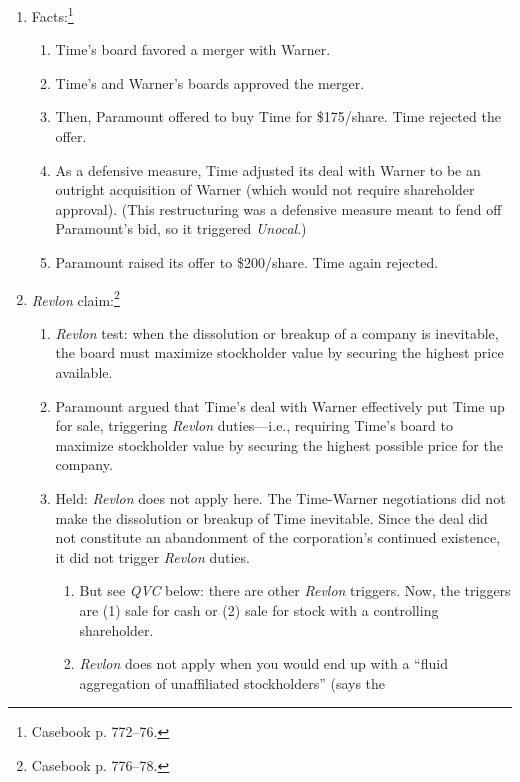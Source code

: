 \begin{enumerate}
    \item Facts:\footnote{Casebook p. 772--76.}
    \begin{enumerate}
        \item Time's board favored a merger with Warner.
        \item Time's and Warner's boards approved the merger.
        \item Then, Paramount offered to buy Time for \$175/share. Time rejected 
        the offer.
        \item As a defensive measure, Time adjusted its deal with Warner to be 
        an outright acquisition of Warner (which would not require shareholder 
        approval). (This restructuring was a defensive measure meant to fend off 
        Paramount's bid, so it triggered \emph{Unocal}.)
        \item Paramount raised its offer to \$200/share. Time again rejected.
    \end{enumerate}
    \item \emph{Revlon} claim:\footnote{Casebook p. 776--78.}
    \begin{enumerate}
        \item \emph{Revlon} test: when the dissolution or breakup of a company 
        is inevitable, the board must maximize stockholder value by securing the 
        highest price available.
        \item Paramount argued that Time's deal with Warner effectively put Time 
        up for sale, triggering \emph{Revlon} duties---i.e., requiring Time's 
        board to maximize stockholder value by securing the highest possible 
        price for the company.
        \item Held: \emph{Revlon} does not apply here. The Time-Warner 
        negotiations did not make the dissolution or breakup of Time inevitable. 
        Since the deal did not constitute an abandonment of the corporation's 
        continued existence, it did not trigger \emph{Revlon} duties.
        \begin{enumerate}
            \item But see \emph{QVC} below: there are other \emph{Revlon} 
            triggers. Now, the triggers are (1) sale for cash or (2) sale for 
            stock with a controlling shareholder.
            \item \emph{Revlon} does not apply when you would end up with a 
            ``fluid aggregation of unaffiliated stockholders'' (says the 

\end{enumerate}
\end{enumerate}
\end{enumerate}
